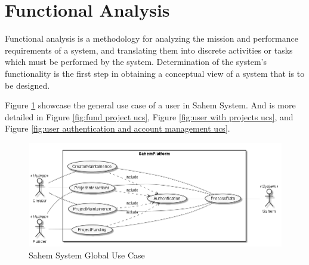 \section{Functional Analysis}
Functional analysis is a methodology for analyzing the mission and performance requirements of a system, and translating them into discrete activities or tasks which must be performed by the system. Determination of the system's functionality is the first step in obtaining a conceptual view of a system that is to be designed.

Figure \ref{fig:globaluc} showcase the general use case of a user in Sahem System. And is more detailed in Figure \ref{fig:fund project ucs}, Figure \ref{fig:user with projects ucs}, and Figure \ref{fig:user authentication and account management ucs}. 
\begin{figure}[!ht]
      \center
      \includegraphics[scale=0.5]{assets/global.png}
      \caption{Sahem System Global Use Case}
      \label{fig:globaluc}
\end{figure}


% 

